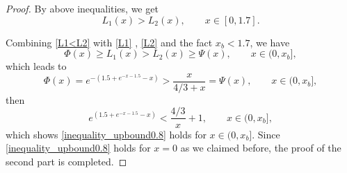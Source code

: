 \documentclass{HZNUMCM}
\begin{document}
\begin{proof}
By above inequalities, we get
\begin{equation}\label{L1<L2}
L_1(x)>L_2(x),\qquad x\in[0,1.7].
\end{equation}

Combining \eqref{L1<L2} with  \eqref{L1} , \eqref{L2} and the fact $x_b<1.7$, we have
$$
\Phi(x)\geqslant L_1(x)> L_2(x)\geqslant\Psi(x),\qquad x\in(0,x_b],
$$
which leads to
$$
\Phi(x)=e^{-(1.5 + e^{-x-1.5} - x)}>\frac{x}{4/3+x}=\Psi(x),\qquad x\in(0,x_b],
$$then
$$
e^{(1.5 + e^{-x-1.5} - x)}<\frac{4/3}{x}+1,\qquad x\in(0,x_b],
$$
which shows \eqref{inequality_upbound0.8} holds for $x\in (0,x_b]$. Since \eqref{inequality_upbound0.8} holds for $x=0$ as we claimed before, the proof of the second part is completed.

\end{proof}
\end{document}
